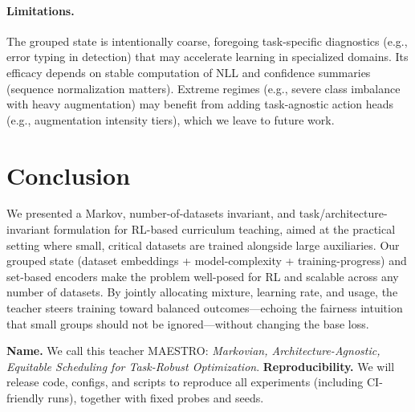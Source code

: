 \documentclass[11pt]{article}
\newcommand{\1}{\mathbf{1}}
\newcommand{\MAESTRO}{\textsc{MAESTRO}\xspace}
\begin{document}
\paragraph{Limitations.}
The grouped state is intentionally coarse, foregoing task-specific diagnostics (e.g., error typing in detection) that may accelerate learning in specialized domains. Its efficacy depends on stable computation of NLL and confidence summaries (sequence normalization matters). Extreme regimes (e.g., severe class imbalance with heavy augmentation) may benefit from adding task-agnostic action heads (e.g., augmentation intensity tiers), which we leave to future work.

\section{Conclusion}
We presented a Markov, number-of-datasets invariant, and task/architecture-invariant formulation for RL-based curriculum teaching, aimed at the practical setting where small, critical datasets are trained alongside large auxiliaries. Our grouped state (dataset embeddings + model-complexity + training-progress) and set-based encoders make the problem well-posed for RL and scalable across any number of datasets. By jointly allocating mixture, learning rate, and usage, the teacher steers training toward balanced outcomes—echoing the fairness intuition that small groups should not be ignored—without changing the base loss. 

\medskip\noindent\textbf{Name.} We call this teacher \MAESTRO{}: \emph{Markovian, Architecture-Agnostic, Equitable Scheduling for Task-Robust Optimization}.
\noindent\textbf{Reproducibility.}
We will release code, configs, and scripts to reproduce all experiments (including CI-friendly runs), together with fixed probes and seeds.
\end{document}
